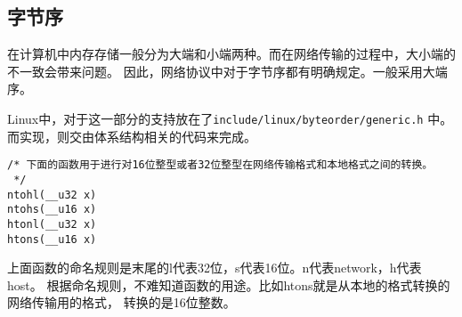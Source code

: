 		\subsection{字节序}
			在计算机中内存存储一般分为大端和小端两种。而在网络传输的过程中，大小端的不一致会带来问题。
因此，网络协议中对于字节序都有明确规定。一般采用大端序。

			Linux中，对于这一部分的支持放在了\texttt{include/linux/byteorder/generic.h}
中。而实现，则交由体系结构相关的代码来完成。

\begin{verbatim}
/* 下面的函数用于进行对16位整型或者32位整型在网络传输格式和本地格式之间的转换。
 */
ntohl(__u32 x)
ntohs(__u16 x)
htonl(__u32 x)
htons(__u16 x)
\end{verbatim}

			上面函数的命名规则是末尾的l代表32位，s代表16位。n代表network，h代表host。
根据命名规则，不难知道函数的用途。比如htons就是从本地的格式转换的网络传输用的格式，
转换的是16位整数。
